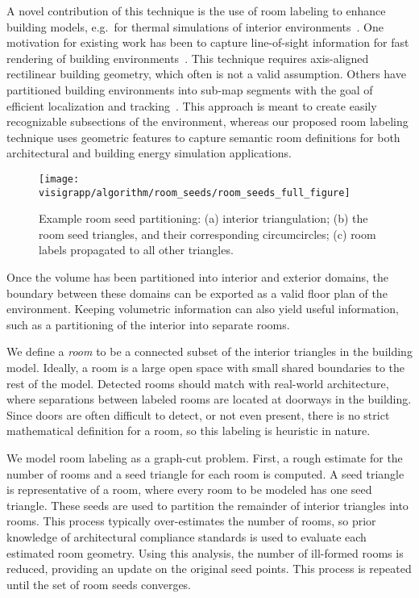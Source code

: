 \documentclass[12pt,onecolumn,oneside]{book}
\begin{document}
A novel contribution of this technique is the use of room labeling to enhance building models, e.g.\ for thermal simulations of interior environments~\cite{Turner14,EnergyPlus}.  One motivation for existing work has been to capture line-of-sight information for fast rendering of building environments~\cite{WalkthroughRendering}.  This technique requires axis-aligned rectilinear building geometry, which often is not a valid assumption.  Others have partitioned building environments into sub-map segments with the goal of efficient localization and tracking~\cite{SpectralClustering}.  This approach is meant to create easily recognizable subsections of the environment, whereas our proposed room labeling technique uses geometric features to capture semantic room definitions for both architectural and building energy simulation applications.

\begin{figure}[t]
  \centering
  \texttt{[image: visigrapp/algorithm/room\_seeds/room\_seeds\_full\_figure]}
  \caption[Example room seed partitioning.]{Example room seed partitioning: (a) interior triangulation; (b) the room seed triangles, and their corresponding circumcircles; (c) room labels propagated to all other triangles.}
  \label{fig:roomlabeling}
\end{figure}

Once the volume has been partitioned into interior and exterior domains, the boundary between these domains can be exported as a valid floor plan of the environment.  Keeping volumetric information can also yield useful information, such as a partitioning of the interior into separate rooms.

We define a {\it room} to be a connected subset of the interior triangles in the building model.  Ideally, a room is a large open space with small shared boundaries to the rest of the model.  Detected rooms should match with real-world architecture, where separations between labeled rooms are located at doorways in the building.  Since doors are often difficult to detect, or not even present, there is no strict mathematical definition for a room, so this labeling is heuristic in nature.

We model room labeling as a graph-cut problem.  First, a rough estimate for the number of rooms and a seed triangle for each room is computed.  A seed triangle is representative of a room, where every room to be modeled has one seed triangle.  These seeds are used to partition the remainder of interior triangles into rooms.  This process typically over-estimates the number of rooms, so prior knowledge of architectural compliance standards is used to evaluate each estimated room geometry.  Using this analysis, the number of ill-formed rooms is reduced, providing an update on the original seed points.  This process is repeated until the set of room seeds converges.
\end{document}
